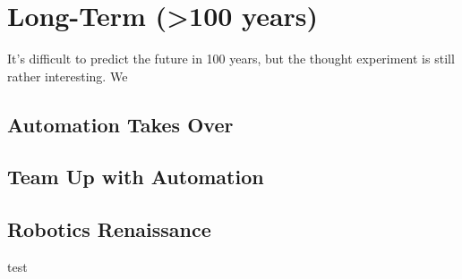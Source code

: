 \section{Long-Term (>100 years)}
\label{sec:long}

It's difficult to predict the future in 100 years, but the thought experiment is still rather interesting. We 

\subsection{Automation Takes Over}

\subsection{Team Up with Automation}

\subsection{Robotics Renaissance}
test